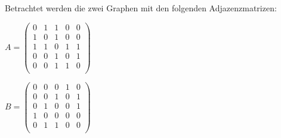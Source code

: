 \documentclass{scrreprt}
\begin{document}
Betrachtet werden die zwei Graphen mit den folgenden Adjazenzmatrizen:
\begin{enumerate*}[(i)]
\item $A = \begin{pmatrix}
  0 & 1 & 1 & 0 & 0 \\
  1 & 0 & 1 & 0 & 0 \\
  1 & 1 & 0 & 1 & 1 \\
  0 & 0 & 1 & 0 & 1 \\
  0 & 0 & 1 & 1 & 0 \\
\end{pmatrix} \qquad$
\item $B = \begin{pmatrix}
  0 & 0 & 0 & 1 & 0 \\
  0 & 0 & 1 & 0 & 1 \\
  0 & 1 & 0 & 0 & 1 \\
  1 & 0 & 0 & 0 & 0 \\
  0 & 1 & 1 & 0 & 0 \\
\end{pmatrix}$
\end{enumerate*}
\end{document}
